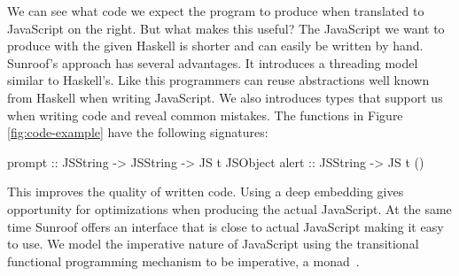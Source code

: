 We can see what code we expect the program to produce when 
translated to JavaScript on the right. But what makes 
this useful? The JavaScript we want to produce with the given
Haskell is shorter and can easily be written by hand.
Sunroof's approach has several advantages. It introduces a 
threading model similar
to Haskell's. Like this programmers can reuse abstractions
well known from Haskell when writing JavaScript.
We also introduces types that support us when 
writing code and reveal common mistakes. The functions
in Figure \ref{fig:code-example} have the following signatures:
\begin{Code}
prompt :: JSString -> JSString -> JS t JSObject
alert  :: JSString -> JS t ()
\end{Code}
This improves the quality of written code.
Using a deep embedding gives opportunity 
for optimizations when producing the actual JavaScript.
At the same time Sunroof offers an interface that is 
close to actual JavaScript making it easy to use.
We model the imperative nature of JavaScript
using the transitional functional programming 
mechanism to be imperative, a monad~\cite{Moggi:91:ComputationMonads}.

